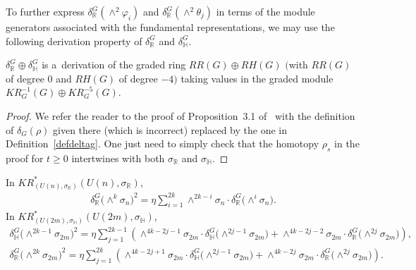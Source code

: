 To further express $\delta_\mathbb{R}^G(\wedge^2\varphi_i)$ and $\delta_\mathbb{R}^G(\wedge^2\theta_j)$ in terms of the
module generators associated with the fundamental representations, we may use the following derivation property of
$\delta_\mathbb{R}^G$ and $\delta_\mathbb{H}^G$.
\begin{Proposition}
\label{eqderivative}
$\delta_\mathbb{R}^G\oplus\delta_\mathbb{H}^G$ is a~derivation of the graded ring $RR(G)\oplus RH(G)$ $($with $RR(G)$ of
degree $0$ and $RH(G)$ of degree $-4)$ taking values in the graded module $KR^{-1}_G(G)\oplus KR^{-5}_G(G)$.
\end{Proposition}
\begin{proof}
We refer the reader to the proof of Proposition~3.1 of~\cite{BZ}
with the def\/inition of $\delta_G(\rho)$ given there
(which is incorrect) replaced by the one in Def\/inition~\ref{defdeltag}.
One just need to simply check that the homotopy $\rho_s$ in the proof for $t\geq 0$ intertwines with both $\sigma_\mathbb{R}$ and $\sigma_\mathbb{H}$.
\end{proof}
\begin{Corollary}
\label{krringunitary}
In $KR^*_{(U(n),
\sigma_\mathbb{R})}(U(n),
\sigma_\mathbb{R})$,
\begin{gather*}
\delta_\mathbb{R}^G\big({\wedge}^k
\sigma_n\big)^2=\eta\sum\limits_{i=1}^{2k}\wedge^{2k-i}
\sigma_n\cdot\delta_\mathbb{R}^G\big({\wedge}^i
\sigma_n\big).
\end{gather*}
In $KR^*_{(U(2m),
\sigma_\mathbb{H})}(U(2m),
\sigma_\mathbb{H})$,
\begin{gather*}
\delta_\mathbb{H}^G\big({\wedge}^{2k-1}\sigma_{2m}\big)^2=\eta\sum\limits_{j=1}^{2k-1}\left(\wedge^{4k-2j-1}
\sigma_{2m}\cdot\delta_\mathbb{H}^G\big({\wedge}^{2j-1}\sigma_{2m}\big)+\wedge^{4k-2j-2}\sigma_{2m}
\cdot\delta_\mathbb{R}^G\big({\wedge}^{2j}\sigma_{2m}\big)\right),
\\
\delta_\mathbb{R}^G\big({\wedge}^{2k}\sigma_{2m}\big)^2=\eta\sum\limits_{j=1}^{2k}\left(\wedge^{4k-2j+1}
\sigma_{2m}\cdot\delta_\mathbb{H}^G\big({\wedge}^{2j-1}\sigma_{2m}\big)+\wedge^{4k-2j}\sigma_{2m}
\cdot\delta_\mathbb{R}^G\big({\wedge}^{2j}\sigma_{2m}\big)\right).
\end{gather*}
\end{Corollary}
